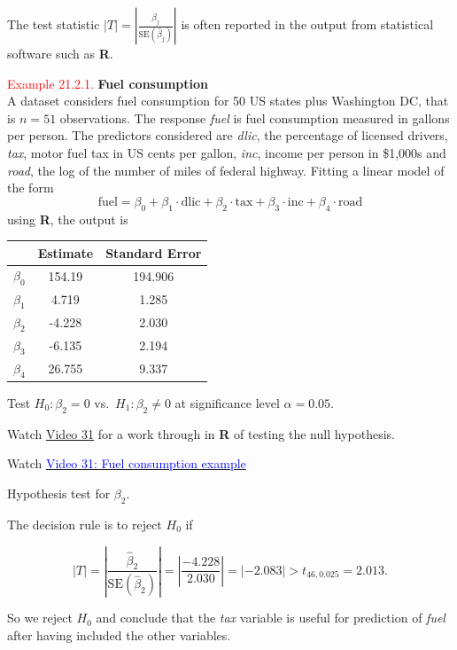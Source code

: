 \documentclass[
]{book}
\begin{document}
The test statistic \(|T| = \left| \frac{ \hat{\beta}_j}{\text{SE}(\hat{\beta}_j)} \right|\) is often reported in the output from statistical software such as \textbf{R}.

\leavevmode{}%
\textcolor{red}{Example 21.2.1.}
{\textbf{Fuel consumption}}\\
A dataset considers fuel consumption for 50 US states plus Washington DC, that is \(n=51\) observations. The response \emph{fuel} is fuel consumption measured in gallons per person. The predictors considered are \emph{dlic}, the percentage of licensed drivers, \emph{tax}, motor fuel tax in US cents per gallon, \emph{inc}, income per person in \$1,000s and \emph{road}, the log of the number of miles of federal highway. Fitting a linear model of the form
\[\text{fuel} = \beta_0 + \beta_1 \cdot \text{dlic} + \beta_2 \cdot \text{tax} + \beta_3 \cdot \text{inc} + \beta_4 \cdot \text{road}\]
using \textbf{R}, the output is

\begin{longtable}[]{@{}ccc@{}}
\toprule\noalign{}
& Estimate & Standard Error \\
\midrule\noalign{}
\endhead
\bottomrule\noalign{}
\endlastfoot
\(\beta_0\) & 154.19 & 194.906 \\
\(\beta_1\) & 4.719 & 1.285 \\
\(\beta_2\) & -4.228 & 2.030 \\
\(\beta_3\) & -6.135 & 2.194 \\
\(\beta_4\) & 26.755 & 9.337 \\
\end{longtable}

Test \(H_0: \beta_2 = 0\) vs.~\(H_1: \beta_2 \neq 0\) at significance level \(\alpha = 0.05\).

\hfill\break
Watch \protect\hyperlink{video31}{Video 31} for a work through in \textbf{R} of testing the null hypothesis.

Watch \href{https://mediaspace.nottingham.ac.uk/media/Fuel+Consumption+FINAL+VERSION/1_x6zqduvu}{\textcolor{blue}{Video 31: Fuel consumption example}}

Hypothesis test for \(\beta_2\).

The decision rule is to reject \(H_0\) if

\[|T| = \left| \frac{\hat{\beta}_2}{\text{SE}(\hat{\beta}_2)} \right| = \left| \frac{-4.228}{2.030} \right| = \left| -2.083 \right| > t_{46,0.025} = 2.013.\]

So we reject \(H_0\) and conclude that the \emph{tax} variable is useful for prediction of \emph{fuel} after having included the other variables.
\end{document}
